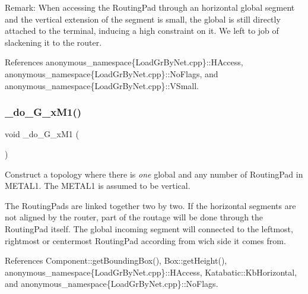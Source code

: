 \begin{DoxyParagraph}{Remark\+:}
When accessing the Routing\+Pad through an horizontal global segment and the vertical extension of the segment is small, the global is still directly attached to the terminal, inducing a high constraint on it. We left to job of slackening it to the router.
\end{DoxyParagraph}
 

References anonymous\+\_\+namespace\{\+Load\+Gr\+By\+Net.\+cpp\}\+::\+H\+Access, anonymous\+\_\+namespace\{\+Load\+Gr\+By\+Net.\+cpp\}\+::\+No\+Flags, and anonymous\+\_\+namespace\{\+Load\+Gr\+By\+Net.\+cpp\}\+::\+V\+Small.

\mbox{\label{group__LoadGlobalRouting_ga97942453a1bc5b01106aa380271fd7fc}} 
\subsubsection{\texorpdfstring{\+\_\+do\+\_\+G\+\_\+x\+M1()}{\_do\_1G\_xM1()}}
{\footnotesize\ttfamily void \+\_\+do\+\_\+G\+\_\+x\+M1 (\begin{DoxyParamCaption}{ }\end{DoxyParamCaption})\hspace{0.3cm}{\ttfamily [private]}}

Construct a topology where there is {\itshape one} global and any number of Routing\+Pad in {\ttfamily M\+E\+T\+A\+L1}. The {\ttfamily M\+E\+T\+A\+L1} is assumed to be vertical.

The Routing\+Pads are linked together two by two. If the horizontal segments are not aligned by the router, part of the routage will be done through the Routing\+Pad itself. The global incoming segment will connected to the leftmost, rightmost or centermost Routing\+Pad according from wich side it comes from.

 

References Component\+::get\+Bounding\+Box(), Box\+::get\+Height(), anonymous\+\_\+namespace\{\+Load\+Gr\+By\+Net.\+cpp\}\+::\+H\+Access, Katabatic\+::\+Kb\+Horizontal, and anonymous\+\_\+namespace\{\+Load\+Gr\+By\+Net.\+cpp\}\+::\+No\+Flags.

\mbox{\label{group__LoadGlobalRouting_gae60ed4e27ad89a1e2ff2cd6415ef33f1}} 
